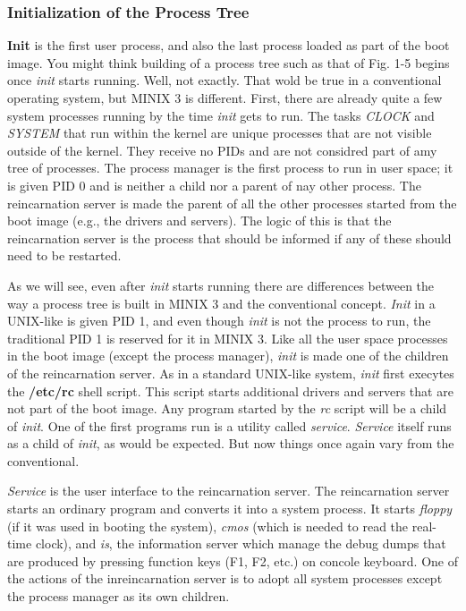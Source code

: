 \documentclass{book}
\newcommand {\kw}  [1] {\textbf{#1}}
\newcommand {\sys} [1] {\textsl{#1}}
\begin{document}
\subsubsection*{Initialization of the Process Tree}
\kw{Init} is the first user process, and also the last process loaded as part of the boot image.
You might think building of a process tree such as that of Fig. 1-5 begins once \sys{init} starts running.
Well, not exactly.
That wold be true in a conventional operating system, but MINIX 3 is different.
First, there are already quite a few system processes running by the time \sys{init} gets to run.
The tasks \sys{CLOCK} and \sys{SYSTEM} that run within the kernel are unique processes that are not visible outside of the kernel.
They receive no PIDs and are not considred part of amy tree of processes.
The process manager is the first process to run in user space;
it is given PID 0 and is neither a child nor a parent of nay other process.
The reincarnation server is made the parent of all the other processes started from the boot image (e.g., the drivers and servers).
The logic of this is that the reincarnation server is the process that should be informed if any of these should need to be restarted.

As we will see, even after \sys{init} starts running there are differences between the way a process tree is built in MINIX 3 
and the conventional concept.
\sys{Init} in a UNIX-like is given PID 1, and even though \sys{init} is not the process to run, 
the traditional PID 1 is reserved for it in MINIX 3.
Like all the user space processes in the boot image (except the process manager),
\sys{init} is made one of the children of the reincarnation server.
As in a standard UNIX-like system, \sys{init} first execytes the \kw{/etc/rc} shell script.
This script starts additional drivers and servers that are not part of the boot image.
Any program started by the \sys{rc} script will be a child of \sys{init}.
One of the first programs run is a utility called \sys{service}.
\sys{Service} itself runs as a child of \sys{init}, as would be expected.
But now things once again vary from the conventional.

\sys{Service} is the user interface to the reincarnation server.
The reincarnation server starts an ordinary program and converts it into a system process.
It starts \sys{floppy} (if it was used in booting the system), \sys{cmos} (which is needed to read the real-time clock), 
and \sys{is}, the information server which manage the debug dumps that are produced by pressing function keys (F1, F2, etc.) on concole keyboard.
One of the actions of the inreincarnation server is to adopt all system processes except the process manager as its own children.
\end{document}
